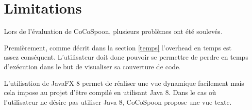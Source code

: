 \section{Limitations}

Lors de l'évaluation de CoCoSpoon, plusieurs problèmes ont été soulevés. \\  
\par Premièrement, comme décrit dans la section \ref{temps} l'overhead en temps est assez conséquent. L'utilisateur doit donc pouvoir se permettre de perdre en temps d'exécution dans le but de visualiser sa couverture de code.
\par L'utilisation de JavaFX 8 permet de réaliser une vue dynamique facilement mais cela impose au projet d'être compilé en utilisant Java 8. Dans le cas où l'utilisateur ne désire pas utiliser Java 8, CoCoSpoon propose une vue texte. 
